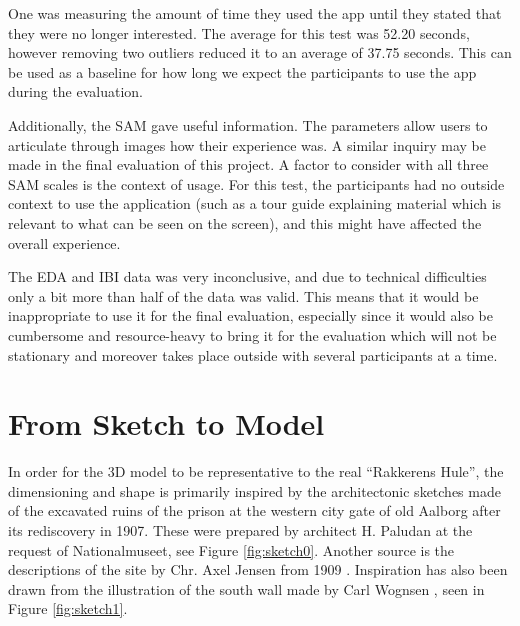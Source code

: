 One was measuring the amount of time they used the app until they stated that they were no longer interested. The average for this test was 52.20 seconds, however removing two outliers reduced it to an average of 37.75 seconds. This can be used as a baseline for how long we expect the participants to use the app during the evaluation.

Additionally, the SAM gave useful information. The parameters allow users to articulate through images how their experience was. A similar inquiry may be made in the final evaluation of this project. A factor to consider with all three SAM scales is the context of usage. For this test, the participants had no outside context to use the application (such as a tour guide explaining material which is relevant to what can be seen on the screen), and this might have affected the overall experience. 

The EDA and IBI data was very inconclusive, and due to technical difficulties only a bit more than half of the data was valid. This means that it would be inappropriate to use it for the final evaluation, especially since it would also be cumbersome and resource-heavy to bring it for the evaluation which will not be stationary and moreover takes place outside with several participants at a time.

\section{From Sketch to Model}
In order for the 3D model to be representative to the real “Rakkerens Hule”, the dimensioning and shape is primarily inspired by the architectonic sketches made of the excavated ruins of the prison at the western city gate of old Aalborg after its rediscovery in 1907. These were prepared by architect H. Paludan at the request of Nationalmuseet, see Figure \ref{fig:sketch0}. Another source is the descriptions of the site by Chr. Axel Jensen from 1909 \cite{Jensen1909}. Inspiration has also been drawn from the illustration of the south wall made by Carl Wognsen \cite{Riismoller1961}, seen in Figure \ref{fig:sketch1}. 

